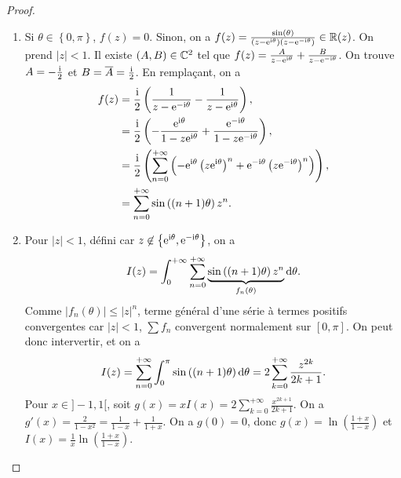 \documentclass[12pt]{article}
\begin{document}
\begin{proof}
    \phantom{}
    \begin{enumerate}
        \item Si $\theta\in\left\lbrace0,\pi\right\rbrace$, $f(z)=0$. Sinon, on a $f(z)=\frac{\sin(\theta)}{\left(z-\mathrm{e}^{\mathrm{i}\theta}\right)\left(z-\mathrm{e}^{-\mathrm{i}\theta}\right)}\in\mathbb{R}(z)$. On prend $\left\lvert z\right\rvert<1$. Il existe $(A,B)\in\mathbb{C}^{2}$ tel que $f(z)=\frac{A}{z-\mathrm{e}^{\mathrm{i}\theta}}+\frac{B}{z-\mathrm{e}^{-\mathrm{i}\theta}}$. On trouve $A=-\frac{\mathrm{i}}{2}$ et $B=\overline{A}=\frac{\mathrm{i}}{2}$. En remplaçant, on a 
        \begin{align}
            f(z)
            &= \frac{\mathrm{i}}{2}\left(\frac{1}{z-\mathrm{e}^{-\mathrm{i}\theta}}-\frac{1}{z-\mathrm{e}^{\mathrm{i}\theta}}\right),\\
            &= \frac{\mathrm{i}}{2}\left(-\frac{\mathrm{e}^{\mathrm{i}\theta}}{1-z\mathrm{e}^{\mathrm{i}\theta}}+\frac{\mathrm{e}^{-\mathrm{i}\theta}}{1-z\mathrm{e}^{-\mathrm{i}\theta}}\right),\\
            &=\frac{\mathrm{i}}{2}\left(\sum_{n=0}^{+\infty}\left(-\mathrm{e}^{\mathrm{i}\theta}\left(z\mathrm{e}^{\mathrm{i}\theta}\right)^{n}+\mathrm{e}^{-\mathrm{i}\theta}\left(z\mathrm{e}^{-\mathrm{i}\theta}\right)^{n}\right)\right),\\
            &=\sum_{n=0}^{+\infty}\sin\left((n+1)\theta\right)z^{n}.
        \end{align}

        \item Pour $\left\lvert z\right\rvert<1$, défini car $z\not\in\left\lbrace\mathrm{e}^{\mathrm{i}\theta},\mathrm{e}^{-\mathrm{i}\theta}\right\rbrace$, on a 
        \begin{equation}
            I(z)=\int_{0}^{+\infty}\sum_{n=0}^{+\infty}\underbrace{\sin\left((n+1)\theta\right)z^{n}}_{f_n(\theta)}\mathrm{d}\theta.
        \end{equation}
        Comme $\left\lvert f_n(\theta)\right\rvert\leqslant\left\lvert z\right\rvert^{n}$, terme général d'une série à termes positifs convergentes car $\left\lvert z\right\rvert<1$, $\sum f_n$ convergent normalement sur $[0,\pi]$. On peut donc intervertir, et on a 
        \begin{equation}
            I(z)=\sum_{n=0}^{+\infty}\int_{0}^{\pi}\sin\left((n+1)\theta\right)\mathrm{d}\theta=2\sum_{k=0}^{+\infty}\frac{z^{2k}}{2k+1}.
        \end{equation}
        Pour $x\in]-1,1[$, soit $g(x)=xI(x)=2\sum_{k=0}^{+\infty}\frac{x^{2k+1}}{2k+1}$. On a $g'(x)=\frac{2}{1-x^{2}}=\frac{1}{1-x}+\frac{1}{1+x}$. On a $g(0)=0$, donc $g(x)=\ln\left(\frac{1+x}{1-x}\right)$ et $I(x)=\frac{1}{x}\ln\left(\frac{1+x}{1-x}\right)$.
    \end{enumerate}
\end{proof}
\end{document}
